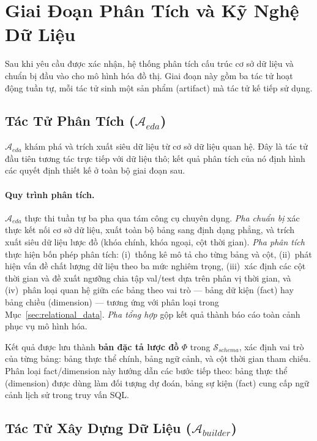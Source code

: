 \section{Giai Đoạn Phân Tích và Kỹ Nghệ Dữ Liệu}

Sau khi yêu cầu được xác nhận, hệ thống phân tích cấu trúc cơ sở dữ liệu và chuẩn bị đầu vào cho mô hình hóa đồ thị. Giai đoạn này gồm ba tác tử hoạt động tuần tự, mỗi tác tử sinh một sản phẩm (artifact) mà tác tử kế tiếp sử dụng.

\subsection{Tác Tử Phân Tích ($\mathcal{A}_{eda}$)}

$\mathcal{A}_{eda}$ khám phá và trích xuất siêu dữ liệu từ cơ sở dữ liệu quan hệ. Đây là tác tử đầu tiên tương tác trực tiếp với dữ liệu thô; kết quả phân tích của nó định hình các quyết định thiết kế ở toàn bộ giai đoạn sau.

\paragraph{Quy trình phân tích.}
$\mathcal{A}_{eda}$ thực thi tuần tự ba pha qua tám công cụ chuyên dụng. \textit{Pha chuẩn bị} xác thực kết nối cơ sở dữ liệu, xuất toàn bộ bảng sang định dạng phẳng, và trích xuất siêu dữ liệu lược đồ (khóa chính, khóa ngoại, cột thời gian). \textit{Pha phân tích} thực hiện bốn phép phân tích: (i)~thống kê mô tả cho từng bảng và cột, (ii)~phát hiện vấn đề chất lượng dữ liệu theo ba mức nghiêm trọng, (iii)~xác định các cột thời gian và đề xuất ngưỡng chia tập val/test dựa trên phân vị thời gian, và (iv)~phân loại quan hệ giữa các bảng theo vai trò --- bảng dữ kiện (fact) hay bảng chiều (dimension) --- tương ứng với phân loại trong Mục~\ref{sec:relational_data}. \textit{Pha tổng hợp} gộp kết quả thành báo cáo toàn cảnh phục vụ mô hình hóa.

Kết quả được lưu thành \textbf{bản đặc tả lược đồ} $\Phi$ trong $\mathcal{S}_{schema}$, xác định vai trò của từng bảng: bảng thực thể chính, bảng ngữ cảnh, và cột thời gian tham chiếu. Phân loại fact/dimension này hướng dẫn các bước tiếp theo: bảng thực thể (dimension) được dùng làm đối tượng dự đoán, bảng sự kiện (fact) cung cấp ngữ cảnh lịch sử trong truy vấn SQL.

\subsection{Tác Tử Xây Dựng Dữ Liệu ($\mathcal{A}_{builder}$)}

